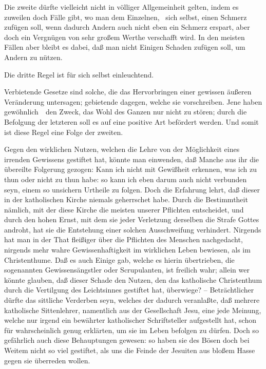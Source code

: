 \begin{aufza}
\begin{aufzb}
\item Die zweite dürfte vielleicht nicht in völliger Allgemeinheit gelten, indem es zuweilen doch Fälle gibt, wo man dem Einzelnen, \zB\ sich selbst, einen Schmerz zufügen soll, wenn dadurch Andern auch nicht eben ein Schmerz erspart, aber doch ein Vergnügen von sehr großem Werthe verschafft wird. In den meisten Fällen aber bleibt es dabei, daß man nicht Einigen Schaden zufügen soll, um Andern zu nützen.
\item Die dritte Regel ist für sich selbst einleuchtend.
\item Verbietende Gesetze sind solche, die das Hervorbringen einer gewissen äußeren Veränderung untersagen; gebietende dagegen, welche sie vorschreiben. Jene haben gewöhnlich~\ den Zweck, das Wohl des Ganzen nur nicht zu stören; durch die Befolgung der letzteren soll es auf eine positive Art befördert werden. Und somit ist diese Regel eine Folge der zweiten.
\end{aufzb}
\end{aufza}
\begin{RWanm} 
Gegen den wirklichen Nutzen, welchen die Lehre von der Möglichkeit eines irrenden Gewissens gestiftet hat, könnte man einwenden, daß Manche aus ihr die übereilte Folgerung gezogen: Kann ich nicht mit Gewißheit erkennen, was ich zu thun oder nicht zu thun habe: so kann ich eben darum auch nicht verbunden seyn, einem so unsichern Urtheile zu folgen. Doch die Erfahrung lehrt, daß dieser  in der katholischen Kirche niemals geherrschet habe. Durch die Bestimmtheit nämlich, mit der diese Kirche die meisten unserer Pflichten entscheidet, und durch den hohen Ernst, mit dem sie jeder Verletzung derselben die Strafe Gottes androht, hat sie die Entstehung einer solchen Ausschweifung verhindert. Nirgends hat man in der That fleißiger über die Pflichten des Menschen nachgedacht, nirgends mehr wahre Gewissenhaftigkeit im wirklichen Leben bewiesen, als im Christenthume. Daß es auch Einige gab, welche es hierin übertrieben, die sogenannten Gewissensängstler oder Scrupulanten, ist freilich wahr; allein wer könnte glauben, daß dieser Schade den Nutzen, den das katholische Christenthum durch die Vertilgung des Leichtsinnes gestiftet hat, überwiege? -- Beträchtlicher dürfte das sittliche Verderben seyn, welches der  dadurch veranlaßte, daß mehrere katholische Sittenlehrer, namentlich aus der Gesellschaft Jesu, eine jede Meinung, welche nur irgend ein bewährter katholischer Schriftsteller aufgestellt hat, schon für wahrscheinlich genug erklärten, um sie im Leben befolgen zu dürfen. Doch so gefährlich auch diese Behauptungen gewesen: so haben sie des Bösen doch bei Weitem nicht so viel gestiftet, als uns die Feinde der Jesuiten aus bloßem Hasse gegen sie überreden wollen. 
\end{RWanm}

